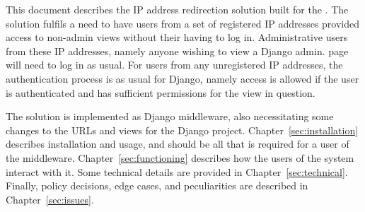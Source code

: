 This document describes the IP address redirection solution built
for the \client. The solution fulfils a need to have users from a set of
registered IP addresses provided access to non-admin views
without their having to log in. Administrative users from these IP
addresses, namely anyone wishing to view a Django admin. page
will need to log in as usual. For users from any unregistered IP
addresses, the authentication process is as usual for Django,
namely access is allowed if the user is authenticated and has
sufficient permissions for the view in question.

The solution is implemented as Django middleware, also
necessitating some changes to the URLs and views for the Django
project. Chapter~\ref{sec:installation} describes installation
and usage, and should be all that is required for a user of the
middleware. Chapter~\ref{sec:functioning} describes how the users
of the system interact with it. Some technical details are
provided in Chapter~\ref{sec:technical}. Finally, policy
decisions, edge cases, and peculiarities are described in
Chapter~\ref{sec:issues}.
